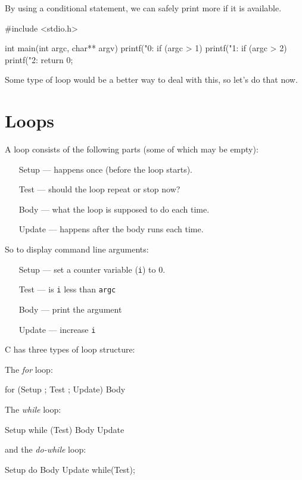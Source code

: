 By using a conditional statement, we can safely print more if it is available.
\begin{codeblock}
#include <stdio.h>

int main(int argc, char** argv) {
    printf("0: %
    if (argc > 1) {
      printf("1: %
    }
    if (argc > 2) {
      printf("2: %
    }
    return 0;
}
\end{codeblock}
Some type of loop would be a better way to deal with this, so let's do that now.

\section{Loops}
A loop consists of the following parts (some of which may be empty):
\begin{itemize}
 \item [Setup] --- happens once (before the loop starts).
 \item [Test]  --- should the loop repeat or stop now?
 \item [Body]  --- what the loop is supposed to do each time.
 \item [Update] --- happens after the body runs each time.
\end{itemize}

So to display command line arguments:
\begin{itemize}
 \item [Setup] --- set a counter variable (\texttt{i}) to 0.
 \item [Test]  --- is \texttt{i} less than \texttt{argc}
 \item [Body]  --- print the argument
 \item [Update] --- increase \texttt{i}
\end{itemize}

C has three types of loop structure:

The \emph{for} loop:
\begin{codeblock}
for (Setup ; Test ; Update) {
    Body
}
\end{codeblock}

The \emph{while} loop:
\begin{codeblock}
Setup
while (Test) {
    Body
    Update
}
\end{codeblock}

and the \emph{do-while} loop:
\begin{codeblock}
Setup
do {
    Body
    Update
} while(Test);
\end{codeblock}


